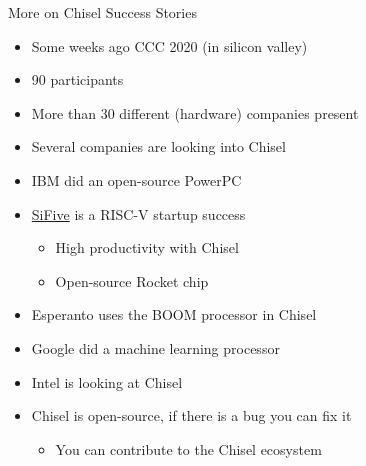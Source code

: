 
\begin{frame}[fragile]{More on Chisel Success Stories}
\begin{itemize}
\item Some weeks ago CCC 2020 (in silicon valley)
\item 90 participants
\item More than 30 different (hardware) companies present
\item Several companies are looking into Chisel
\item IBM did an open-source PowerPC
\item \href{https://www.sifive.com/}{SiFive} is a RISC-V startup success
\begin{itemize}
\item High productivity with Chisel
\item Open-source Rocket chip
\end{itemize}
\item Esperanto uses the BOOM processor in Chisel
\item Google did a machine learning processor
\item Intel is looking at Chisel
\item Chisel is open-source, if there is a bug you can fix it
\begin{itemize}
\item You can contribute to the Chisel ecosystem
\end{itemize}
\end{itemize}
\end{frame}


